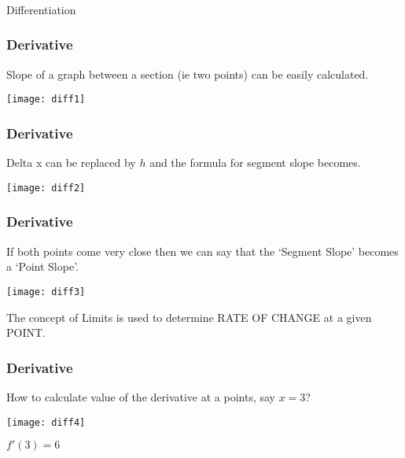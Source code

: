 \begin{frame}[fragile]\frametitle{}
\begin{center}
{\Large Differentiation}
\end{center}
\end{frame}


 \begin{frame}[fragile]\frametitle{Derivative}
Slope of a graph between a section (ie two points) can be easily calculated.
\begin{center}
\texttt{[image: diff1]}
\end{center}

\end{frame}


 \begin{frame}[fragile]\frametitle{Derivative}
Delta x can be replaced by $h$ and the formula for segment slope becomes.
\begin{center}
\texttt{[image: diff2]}
\end{center}

\end{frame}

 \begin{frame}[fragile]\frametitle{Derivative}
If both points come very close then we can say that the `Segment Slope' becomes a `Point Slope'.
\begin{center}
\texttt{[image: diff3]}
\end{center}
The concept of Limits is used to determine RATE OF CHANGE at a given POINT.

\end{frame}

 \begin{frame}[fragile]\frametitle{Derivative}
How to calculate value of the derivative at a points, say $x=3$?

\begin{center}
\texttt{[image: diff4]}
\end{center}

$f'(3) = 6$
\end{frame}


